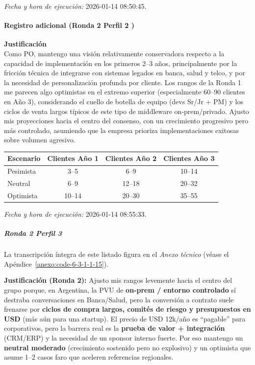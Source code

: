 \textit{Fecha y hora de ejecución:} 2026-01-14 08:50:45.

\paragraph{Registro adicional (Ronda 2 Perfil 2 )}

\textbf{Justificación  }\\
Como PO, mantengo una visión relativamente conservadora respecto a la capacidad de implementación en los primeros 2–3 años, principalmente por la fricción técnica de integrarse con sistemas legados en banca, salud y telco, y por la necesidad de personalización profunda por cliente. Los rangos de la Ronda 1 me parecen algo optimistas en el extremo superior (especialmente 60–90 clientes en Año 3), considerando el cuello de botella de equipo (devs Sr/Jr + PM) y los ciclos de venta largos típicos de este tipo de middleware on‑prem/privado. Ajusto mis proyecciones hacia el centro del consenso, con un crecimiento progresivo pero más controlado, asumiendo que la empresa prioriza implementaciones exitosas sobre volumen agresivo.

\begin{center}
\footnotesize
\begin{tabular}{|l|c|c|c|}
\hline
\textbf{Escenario} & \textbf{Clientes Año 1} & \textbf{Clientes Año 2} & \textbf{Clientes Año 3} \\
\hline
Pesimista & 3--5 & 6--9 & 10--14 \\
\hline
Neutral & 6--9 & 12--18 & 20--32 \\
\hline
Optimista & 10--14 & 20--30 & 35--55 \\
\hline
\end{tabular}
\end{center}

\textit{Fecha y hora de ejecución:} 2026-01-14 08:55:33.

\subparagraph{Ronda 2 Perfil 3}

La transcripción íntegra de este listado figura en el \textit{Anexo técnico} (véase el Apéndice~\ref{anexo:code-6-3-1-1-15}).

\textbf{Justificación (Ronda 2):} Ajusto mis rangos levemente hacia el centro del grupo porque, en Argentina, la PVU de \textbf{on‑prem / entorno controlado} sí destraba conversaciones en Banca/Salud, pero la conversión a contrato suele frenarse por \textbf{ciclos de compra largos, comités de riesgo y presupuestos en USD} (más aún para una startup). El precio de USD 12k/año es ``pagable'' para corporativos, pero la barrera real es la \textbf{prueba de valor + integración} (CRM/ERP) y la necesidad de un sponsor interno fuerte. Por eso mantengo un \textbf{neutral moderado} (crecimiento sostenido pero no explosivo) y un optimista que asume 1–2 casos faro que aceleren referencias regionales.


